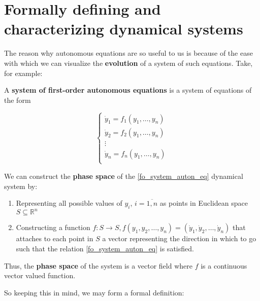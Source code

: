 \section{Formally defining and characterizing dynamical systems}
The reason why autonomous equations are so useful to us is because of the ease with which we can visualize the \textbf{evolution} of a system of such equations.
Take, for example:
\begin{definition}
  A \textbf{system of first-order autonomous equations} is a system of equations of the form

  \begin{equation}\label{fo_system_auton_eq}
    \begin{cases}
      \dot{y}_1 = f_1(y_1,\dots, y_n) \\
      \dot{y}_2 = f_2(y_1,\dots, y_n) \\
      \vdots                          \\
      \dot{y}_n = f_n(y_1,\dots, y_n) \\
    \end{cases}
  \end{equation}
\end{definition}

\begin{definition}
  We can construct the \textbf{phase space} of the \ref{fo_system_auton_eq} dynamical system by:

  \begin{enumerate}
    \item Representing all possible values of $y_i$, $ i = \overline{1,n}$ as points in Euclidean space $S \subseteq \mathbb{R}^n$

    \item Constructing a function $f : S \rightarrow S, f(y_1,y_2,\dots,y_n) = (\dot{y}_1,\dot{y}_2,\dots,\dot{y}_n)$ that attaches to each point in $S$ a vector representing the direction in which to go such that the relation \ref{fo_system_auton_eq} is satisfied.
  \end{enumerate}
\end{definition}

Thus, the \textbf{phase space} of the system is a vector field where $f$ is a continuous vector valued function.

So keeping this in mind, we may form a formal definition:

